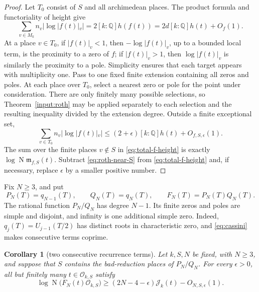 \documentclass[11pt,reqno]{amsart}
\newtheorem{corollary}[theorem]{Corollary}
\theoremstyle{definition}
\theoremstyle{remark}
\newcommand{\Q}{\mathbb Q}
\newcommand{\cO}{\mathcal O}
\newcommand{\cJ}{\mathcal J}
\newcommand{\Norm}{\operatorname{N}}
\begin{document}
\begin{proof}
Let \(T_0\) consist of \(S\) and all archimedean places.  The product
formula and functoriality of height give
\begin{equation}\label{eq:total-f-height}
 \sum_{v\in M_k}n_v|\log|f(t)|_v|
 =2[k:\Q]h(f(t))
 =2d[k:\Q]h(t)+O_f(1).
\end{equation}
At a place \(v\in T_0\), if \(|f(t)|_v<1\), then
\(-\log|f(t)|_v\), up to a bounded local term, is the proximity to a zero
of \(f\); if \(|f(t)|_v>1\), then \(\log|f(t)|_v\) is similarly the
proximity to a pole.  Simplicity ensures that each target appears with
multiplicity one.  Pass to one fixed finite extension containing all zeros
and poles.  At each place over \(T_0\), select a nearest zero or pole for
the point under consideration.  There are only finitely many possible
selections, so Theorem~\ref{input:roth} may be applied separately to each
selection and the resulting inequality divided by the extension degree.
Outside a finite exceptional set,
\begin{equation}\label{eq:roth-near-S}
 \sum_{v\in T_0}n_v|\log|f(t)|_v|
 \le(2+\epsilon)[k:\Q]h(t)+O_{f,S,\epsilon}(1).
\end{equation}
The sum over the finite places \(v\notin S\) in
\eqref{eq:total-f-height} is exactly
\(\log\Norm\mathfrak m_{f,S}(t)\).  Subtract
\eqref{eq:roth-near-S} from \eqref{eq:total-f-height} and, if necessary,
replace \(\epsilon\) by a smaller positive number.
\end{proof}

Fix \(N\ge3\), and put
\begin{equation}\label{eq:PN-QN-FN}
 P_N(T)=q_{N-1}(T),\qquad Q_N(T)=q_N(T),\qquad
 F_N(T)=P_N(T)Q_N(T).
\end{equation}
The rational function \(P_N/Q_N\) has degree \(N-1\).  Its finite zeros
and poles are simple and disjoint, and infinity is one additional simple
zero.  Indeed, \(q_j(T)=U_{j-1}(T/2)\) has distinct roots in characteristic
zero, and \eqref{eq:cassini} makes consecutive terms coprime.

\begin{corollary}[two consecutive recurrence terms]
\label{cor:roth-recurrence-pair}
Let \(k,S,N\) be fixed, with \(N\ge3\), and suppose that \(S\) contains the
bad-reduction places of \(P_N/Q_N\).  For every \(\epsilon>0\), all but
finitely many \(t\in\cO_{k,S}\) satisfy
\begin{equation}\label{eq:roth-recurrence-pair}
 \log\Norm\bigl(F_N(t)\cO_{k,S}\bigr)
 \ge(2N-4-\epsilon)\cJ_k(t)-O_{N,S,\epsilon}(1).
\end{equation}
\end{corollary}
\end{document}
